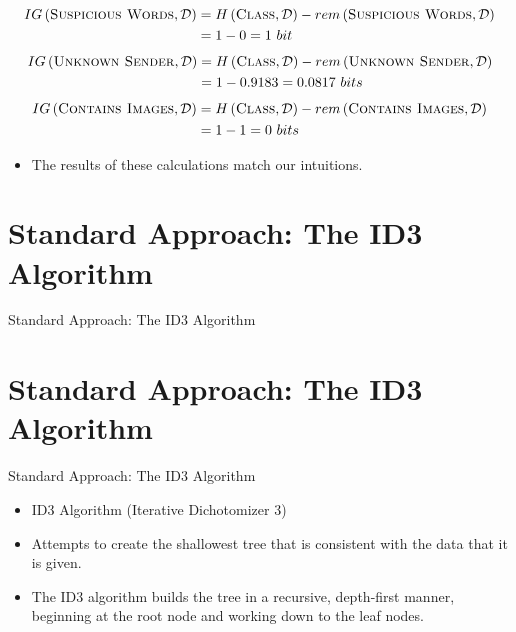 \documentclass[xcolor={table}]{beamer}
\newcommand{\SectionSlide}[2][]{
	\ifthenelse{\isempty{#1}}
		{\section{#2}\begin{frame} \begin{center}\begin{huge}#2\end{huge}\end{center}\end{frame}}
		{\section[#1]{#2}\begin{frame} \begin{center}\begin{huge}#2\end{huge}\end{center}\end{frame}}
}
\newcommand{\featN}[1]{\textsc{#1}}
\begin{document}
 \begin{frame} 
\begin{footnotesize}
\begin{equation*}
\begin{alignedat}{2}
IG\left(\text{\featN{Suspicious Words}},\mathcal{D}\right)&= H\left(\featN{Class},\mathcal{D}\right) - rem\left(\text{\featN{Suspicious Words}},\mathcal{D}\right)\\
& = 1 - 0 = 1~bit\\
	\end{alignedat}
\label{eq:infogainsw}
\end{equation*}
\begin{equation*}
\begin{alignedat}{2}
IG\left(\text{\featN{Unknown Sender}},\mathcal{D}\right)&= H\left(\featN{Class},\mathcal{D}\right) - rem\left(\text{\featN{Unknown Sender}},\mathcal{D}\right)\\
&= 1 - 0.9183 = 0.0817~bits\\
	\end{alignedat}
\label{eq:infogainus}
\end{equation*}
\begin{equation*}
\begin{alignedat}{2}
IG\left(\text{\featN{Contains Images}},\mathcal{D}\right)&= H\left(\featN{Class},\mathcal{D}\right) - rem\left(\text{\featN{Contains Images}},\mathcal{D}\right)\\
&= 1 - 1 = 0~bits\\
	\end{alignedat}
\label{eq:infogainimages}
\end{equation*}
\end{footnotesize}
\begin{itemize}
	\item The results of these calculations match our intuitions.
\end{itemize}
\end{frame} 

\SectionSlide{Standard Approach: The ID3 Algorithm}

\begin{frame}
	\begin{itemize}
		\item ID3 Algorithm (Iterative Dichotomizer 3)
		\item Attempts to create the shallowest tree that is consistent with the data that it is given.
		\item The ID3 algorithm builds the tree in a recursive, depth-first manner, beginning at the root node and working down to the leaf nodes.
	\end{itemize}
\end{frame}
\end{document}
